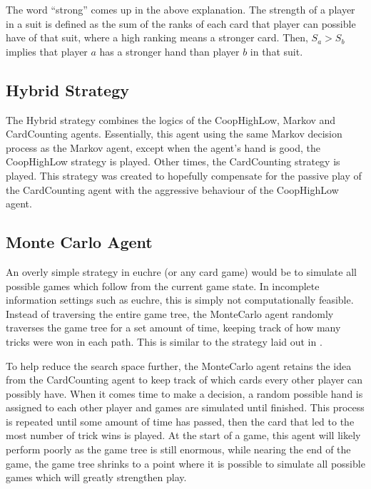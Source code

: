 The word ``strong'' comes up in the above explanation. The strength of a player in a suit is defined as the sum of the ranks of
each card that player can possible have of that suit, where a high ranking means a stronger card. Then, $S_a > S_b$ implies that player $a$
has a stronger hand than player $b$ in that suit.

\subsection{Hybrid Strategy}

The Hybrid strategy combines the logics of the CoopHighLow, Markov and CardCounting agents. Essentially, this agent using the same Markov decision
process as the Markov agent, except when the agent's hand is good, the CoopHighLow strategy is played. Other times, the CardCounting strategy is played.
This strategy was created to hopefully compensate for the passive play of the CardCounting agent with the aggressive behaviour of the CoopHighLow agent.

\subsection{Monte Carlo Agent}

An overly simple strategy in euchre (or any card game) would be to simulate all possible games which follow from the current game state. In incomplete
information settings such as euchre, this is simply not computationally feasible. Instead of traversing the entire game tree, the MonteCarlo agent
randomly traverses the game tree for a set amount of time, keeping track of how many tricks were won in each path. This is similar to the strategy
laid out in \cite{skat}.

To help reduce the search space further, the MonteCarlo agent retains the idea from the CardCounting agent to keep track of which cards every
other player can possibly have. When it comes time to make a decision, a random possible hand is assigned to each other player and games are
simulated until finished. This process is repeated until some amount of time has passed, then the card that led to the most number of trick
wins is played. At the start of a game, this agent will likely perform poorly as the game tree is still enormous, while nearing the end of the
game, the game tree shrinks to a point where it is possible to simulate all possible games which will greatly strengthen play.


